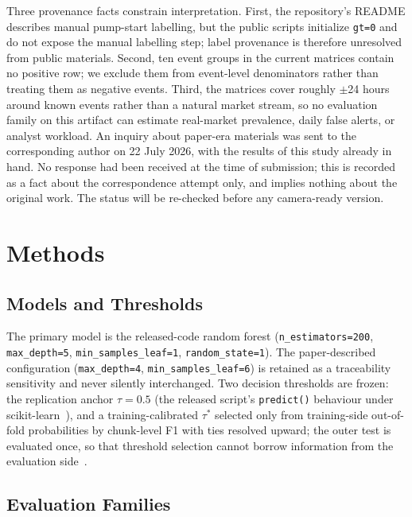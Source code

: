 \documentclass[runningheads]{llncs}
\begin{document}
Three provenance facts constrain interpretation. First, the
repository's README describes manual pump-start labelling, but the
public scripts initialize \texttt{gt=0} and do not expose the manual
labelling step; label provenance is therefore unresolved from public
materials. Second, ten event groups in the current matrices contain no
positive row; we exclude them from event-level denominators rather than
treating them as negative events. Third, the matrices cover roughly
$\pm$24 hours around known events rather than a natural market stream,
so no evaluation family on this artifact can estimate real-market
prevalence, daily false alerts, or analyst workload. An inquiry about
paper-era materials was sent to the corresponding author on 22 July
2026, with the results of this study already in hand. No response had
been received at the time of submission; this is recorded as a fact
about the correspondence attempt only, and implies nothing about the
original work. The status will be re-checked before any camera-ready
version.

\section{Methods}\label{sec:methods}

\subsection{Models and Thresholds}\label{sec:models}

The primary model is the released-code random forest
(\texttt{n\_estimators=200}, \texttt{max\_depth=5},
\texttt{min\_samples\_leaf=1}, \texttt{random\_state=1}). The
paper-described configuration (\texttt{max\_depth=4},
\texttt{min\_samples\_leaf=6}) is retained as a traceability
sensitivity and never silently interchanged. Two decision thresholds
are frozen: the replication anchor $\tau = 0.5$ (the released script's
\texttt{predict()} behaviour under scikit-learn~\cite{Sklearn2011}),
and a training-calibrated $\tau^{*}$ selected only from training-side
out-of-fold probabilities by chunk-level F1 with ties resolved upward;
the outer test is evaluated once, so that threshold selection cannot
borrow information from the evaluation
side~\cite{Varma2006,Cawley2010}.

\subsection{Evaluation Families}\label{sec:evalfamilies}
\end{document}
